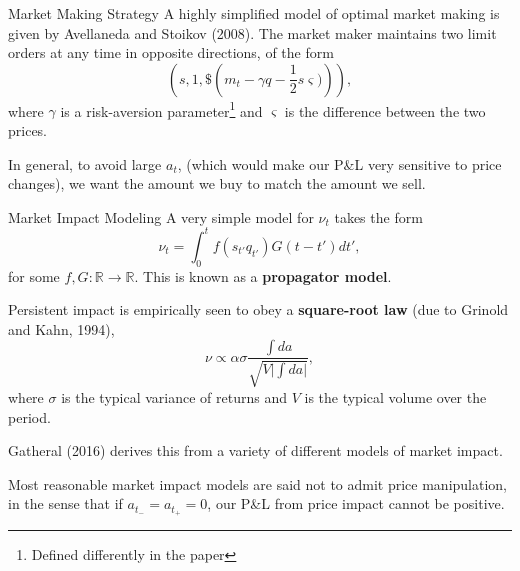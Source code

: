 \documentclass{beamer}
\begin{document}
\begin{frame}{Market Making Strategy}
	A highly simplified model of optimal market making is given by Avellaneda and Stoikov (2008). The market maker maintains two limit orders at any time in opposite directions, of the form
	$$\left(s, 1, \$\left(m_t - \gamma q - \frac{1}{2}s\varsigma)\right)\right),$$
	where $\gamma$ is a risk-aversion parameter\footnote{Defined differently in the paper} and $\varsigma$ is the difference between the two prices.

	In general, to avoid large $a_t$, (which would make our P\&L very sensitive to price changes), we want the amount we buy to match the amount we sell. %
\end{frame}

\begin{frame}{Market Impact Modeling}
	A very simple model for $\nu_t$ takes the form
	$$\nu_t = \int_0^t f(s_{t'}q_{t'})G(t-t')dt',$$
	for some $f,G:\mathbb{R}\to\mathbb{R}$. This is known as a \textbf{propagator model}.

	Persistent impact is empirically seen to obey a \textbf{square-root law} (due to Grinold and Kahn, 1994),
	$$\nu \propto \alpha\sigma\frac{\int da}{\sqrt{V \vert \int da\vert}},$$
	where $\sigma$ is the typical variance of returns and $V$ is the typical volume over the period.

	Gatheral (2016) derives this from a variety of different models of market impact.

	Most reasonable market impact models are said not to admit price manipulation, in the sense that if $a_{t_-}=a_{t_+}=0$, our P\&L from price impact cannot be positive.
\end{frame}
\end{document}

